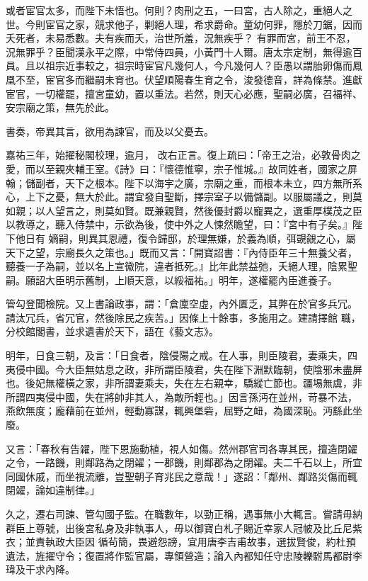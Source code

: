 \begin{pinyinscope}
 或者宦官太多，而陛下未悟也。何則？肉刑之五，一曰宮，古人除之，重絕人之世。今則宦官之家，競求他子，剿絕人理，希求爵命。童幼何罪，隱於刀鋸，因而夭死者，未易悉數。夫有疾而夭，治世所羞，況無疾乎？
 有罪而宮，前王不忍，況無罪乎？臣聞漢永平之際，中常侍四員，小黃門十人爾。唐太宗定制，無得逾百員。且以祖宗近事較之，祖宗時宦官凡幾何人，今凡幾何人？臣愚以謂胎卵傷而鳳凰不至，宦官多而繼嗣未育也。伏望順陽春生育之令，浚發德音，詳為條禁。進獻宦官，一切權罷，擅宮童幼，置以重法。若然，則天心必應，聖嗣必廣，召福祥、安宗廟之策，無先於此。



 書奏，帝異其言，欲用為諫官，而及以父憂去。



 嘉祐三年，始擢秘閣校理，逾月，
 改右正言。復上疏曰：「帝王之治，必敦骨肉之愛，而以至親夾輔王室。《詩》曰：『懷德惟寧，宗子惟城。』故同姓者，國家之屏翰；儲副者，天下之根本。陛下以海宇之廣，宗廟之重，而根本未立，四方無所系心，上下之憂，無大於此。謂宜發自聖斷，擇宗室子以備儲副。以服屬議之，則莫如親；以人望言之，則莫如賢。既兼親賢，然後優封爵以寵異之，選重厚樸茂之臣以教導之，聽入侍禁中，示欲為後，使中外之人悚然瞻望，曰：『宮中有子矣。』陛下他日有
 嫡嗣，則異其恩禮，復令歸邸，於理無嫌，於義為順，弭覬覦之心，屬天下之望，宗廟長久之策也。」既而又言：「開寶詔書：『內侍臣年三十無養父者，聽養一子為嗣，並以名上宣徽院，違者抵死。』比年此禁益弛，夭絕人理，陰累聖嗣。願詔大臣明示舊制，上順天意，以綏福祐。」明年，遂權罷內臣進養子。



 管勾登聞檢院。又上書論政事，謂：「倉廩空虛，內外匱乏，其弊在於官多兵冗。請汰冗兵，省冗官，然後除民之疾苦。」因條上十餘事，多施用之。建請擇館
 職，分校館閣書，並求遺書於天下，語在《藝文志》。



 明年，日食三朝，及言：「日食者，陰侵陽之戒。在人事，則臣陵君，妻乘夫，四夷侵中國。今大臣無姑息之政，非所謂臣陵君，失在陛下淵默臨朝，使陰邪未盡屏也。後妃無權橫之家，非所謂妻乘夫，失在左右親幸，驕縱亡節也。疆埸無虞，非所謂四夷侵中國，失在將帥非其人，為敵所輕也。」因言孫沔在並州，苛暴不法，燕飲無度；龐藉前在並州，輕動寡謀，輒興堡砦，屈野之衄，為國深恥。沔繇此坐廢。



 又言：「春秋有告糴，陛下恩施動植，視人如傷。然州郡官司各專其民，擅造閉糴之令，一路饑，則鄰路為之閉糴；一郡饑，則鄰郡為之閉糴。夫二千石以上，所宜同國休戚，而坐視流離，豈聖朝子育兆民之意哉！」遂詔：「鄰州、鄰路災傷而輒閉糴，論如違制律。」



 久之，遷右司諫、管勾國子監。在職數年，以勁正稱，遇事無小大輒言。嘗請毋納群臣上尊號，出後宮私身及非執事人，毋以御寶白札子賜近幸家人冠帔及比丘尼紫衣；並責執政大臣因
 循茍簡，畏避怨謗，宜用唐李吉甫故事，選拔賢俊，約杜預遺法，旌擢守令；復置將作監官屬，專領營造；論入內都知任守忠陵轢駙馬都尉李瑋及干求內降。




\end{pinyinscope}
